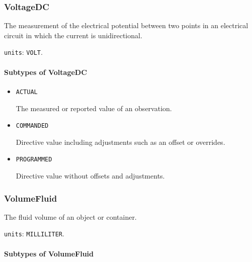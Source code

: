 \subsubsection{VoltageDC}
\label{sec:VoltageDC}



The measurement of the electrical potential between two points in an electrical circuit in which the current is unidirectional.


\texttt{units}: \texttt{VOLT}.

\paragraph{Subtypes of VoltageDC}\mbox{}
\label{sec:Subtypes of VoltageDC}

\begin{itemize}

\item \texttt{ACTUAL}


The measured or reported value of an \gls{observation}.

\item \texttt{COMMANDED}


Directive value including adjustments such as an offset or overrides.

\item \texttt{PROGRAMMED}


Directive value without offsets and adjustments.


\end{itemize}






\subsubsection{VolumeFluid}
\label{sec:VolumeFluid}



The fluid volume of an object or container.


\texttt{units}: \texttt{MILLILITER}.

\paragraph{Subtypes of VolumeFluid}\mbox{}
\label{sec:Subtypes of VolumeFluid}

